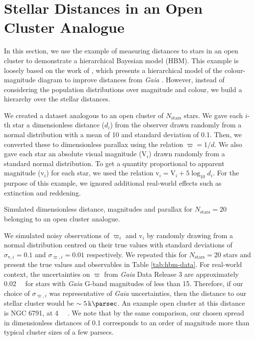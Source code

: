 \section[Stellar Distances]{Stellar Distances in an Open Cluster Analogue}\label{sec:hbm-dist}

\newcommand{\appmag}{\ensuremath{\mathrm{v}}}
\newcommand{\absmag}{\ensuremath{\mathrm{V}}}

In this section, we use the example of measuring distances to stars in an open cluster to demonstrate a hierarchical Bayesian model (HBM). This example is loosely based on the work of \citet{Leistedt.Hogg2017}, which presents a hierarchical model of the colour-magnitude diagram to improve distances from \emph{Gaia} \citep{GaiaCollaboration.Prusti.ea2016}. However, instead of considering the population distributions over magnitude and colour, we build a hierarchy over the stellar distances.

We created a dataset analogous to an open cluster of \(N_\mathrm{stars}\) stars. We gave each \(i\)-th star a dimensionless distance (\(d_i\)) from the observer drawn randomly from a normal distribution with a mean of 10 and standard deviation of 0.1. Then, we converted these to dimensionless parallax using the relation \(\varpi = 1/d\). We also gave each star an absolute visual magnitude (\(\absmag_i\)) drawn randomly from a standard normal distribution. To get a quantity proportional to apparent magnitude (\(\appmag_i\)) for each star, we used the relation \(\appmag_i = \absmag_i + 5 \log_{10} d_i\). For the purpose of this example, we ignored additional real-world effects such as extinction and reddening.

\begin{table}[tb]
    \centering
    \caption{Simulated dimensionless distance, magnitudes and parallax for \(N_\mathrm{stars}=20\) belonging to an open cluster analogue.}
    \label{tab:hbm-data}
    
\end{table}

We simulated noisy observations of \(\varpi_i\) and \(\appmag_i\) by randomly drawing from a normal distribution centred on their true values with standard deviations of \(\sigma_{\appmag,i} = 0.1\) and \(\sigma_{\varpi,i} = 0.01\) respectively. We repeated this for \(N_\mathrm{stars}=20\) stars and present the true values and observables in Table \ref{tab:hbm-data}. For real-world context, the uncertainties on \(\varpi\) from \emph{Gaia} \citep{GaiaCollaboration.Prusti.ea2016} Data Release 3 \citep[][]{GaiaCollaboration.Vallenari.ea2022} are approximately \SI{0.02}{\milli\aarcsec} for stars with \emph{Gaia} G-band magnitudes of less than 15. Therefore, if our choice of \(\sigma_{\varpi,i}\) was representative of \emph{Gaia} uncertainties, then the distance to our stellar cluster would be \(\sim \SI{5}{\kilo\parsec}\). An example open cluster at this distance is NGC 6791, at \SI{4}{\kilo\parsec} \citep{Brogaard.Bruntt.ea2011}. We note that by the same comparison, our chosen spread in dimensionless distances of 0.1 corresponds to an order of magnitude more than typical cluster sizes of a few parsecs.

